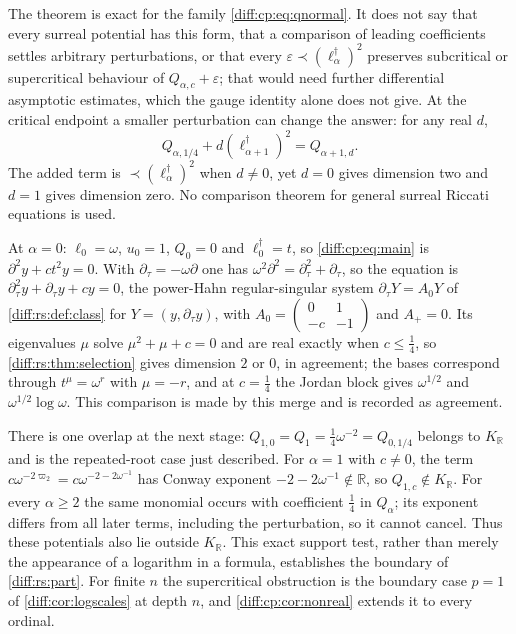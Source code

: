 \documentclass[11pt,letterpaper]{article}
\numberwithin{equation}{section}
\theoremstyle{definition}
\theoremstyle{remark}
\newcommand{\R}{\mathbb R}
\newcommand{\der}{\partial}
\newcommand{\derT}{\der_{\tau}}
\newcommand{\KR}{K_{\R}}
\begin{document}
\begin{remark}
\label{diff:cp:rem:notarbitrary}
The theorem is exact for the family \cref{diff:cp:eq:qnormal}. It does not
say that every surreal potential has this form, that a comparison of leading
coefficients settles arbitrary perturbations, or that every
$\varepsilon\prec(\ell_{\alpha}^{\dagger})^{2}$ preserves subcritical or
supercritical behaviour of $Q_{\alpha,c}+\varepsilon$; that would need further
differential asymptotic estimates, which the gauge identity alone does not
give. At the critical endpoint a smaller perturbation can change
the answer: for any real $d$,
\[
 Q_{\alpha,1/4}+d(\ell_{\alpha+1}^{\dagger})^{2}
 =Q_{\alpha+1,d}.
\]
The added term is $\prec(\ell_{\alpha}^{\dagger})^{2}$ when
$d\neq0$, yet $d=0$ gives dimension two and $d=1$ gives dimension
zero. No comparison theorem for general surreal Riccati equations
is used.
\end{remark}

\begin{remark}
\label{diff:cp:rem:stagezero}
At $\alpha=0$: $\ell_{0}=\omega$, $u_{0}=1$, $Q_{0}=0$ and
$\ell_{0}^{\dagger}=t$, so \cref{diff:cp:eq:main} is $\der^{2}y+ct^{2}y=0$. With
$\derT=-\omega\der$ one has $\omega^{2}\der^{2}=\derT^{2}+\derT$, so the
equation is $\derT^{2}y+\derT y+cy=0$, the power-Hahn regular-singular system
$\derT Y=A_{0}Y$ of \cref{diff:rs:def:class} for $Y=(y,\derT y)$, with
$A_{0}=\left(\begin{smallmatrix}0&1\\-c&-1\end{smallmatrix}\right)$ and
$A_{+}=0$. Its eigenvalues $\mu$ solve $\mu^{2}+\mu+c=0$ and are real exactly
when $c\leq\frac14$, so \cref{diff:rs:thm:selection} gives dimension $2$ or
$0$, in agreement; the bases correspond through $t^{\mu}=\omega^{r}$ with
$\mu=-r$, and at $c=\frac14$ the Jordan block gives $\omega^{1/2}$ and
$\omega^{1/2}\log\omega$. This comparison is made by this merge and is
recorded as agreement.

There is one overlap at the next stage:
$Q_{1,0}=Q_{1}=\frac14\omega^{-2}=Q_{0,1/4}$ belongs to $\KR$
and is the repeated-root case just described. For $\alpha=1$
with $c\neq0$, the term
$c\omega^{-2\varpi_{2}}=c\omega^{-2-2\omega^{-1}}$ has Conway
exponent $-2-2\omega^{-1}\notin\R$, so $Q_{1,c}\notin\KR$. For every $\alpha\geq2$
the same monomial occurs with coefficient $\frac14$ in
$Q_{\alpha}$; its exponent differs from all later terms, including
the perturbation, so it cannot cancel. Thus these potentials
also lie outside $\KR$. This exact support test, rather than
merely the appearance of a logarithm in a formula, establishes
the boundary of \cref{diff:rs:part}. For finite $n$ the
supercritical obstruction is the boundary case $p=1$ of
\cref{diff:cor:logscales} at depth $n$, and \cref{diff:cp:cor:nonreal} extends
it to every ordinal.
\end{remark}
\end{document}
